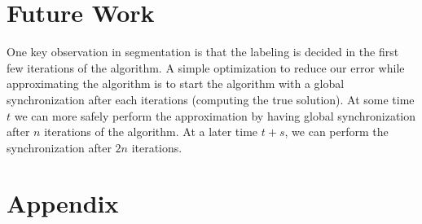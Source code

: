 \documentclass[
10pt, %
letterpaper, %
oneside, %
headinclude,footinclude, %
BCOR5mm, %
]{scrartcl}
\begin{document}

\section{Future Work}

One key observation in segmentation is that the labeling is decided in the
  first few iterations of the algorithm.
A simple optimization to reduce our error while approximating the algorithm is to
  start the algorithm with a global synchronization after each iterations (computing
  the true solution).
At some time $t$ we can more safely perform the approximation by having global synchronization after $n$ iterations of the algorithm.
At a later time $t+s$, we can perform the synchronization after $2n$ iterations.




\renewcommand{\refname}{\spacedlowsmallcaps{References}} %







\newpage


\section{Appendix}



\end{document}
